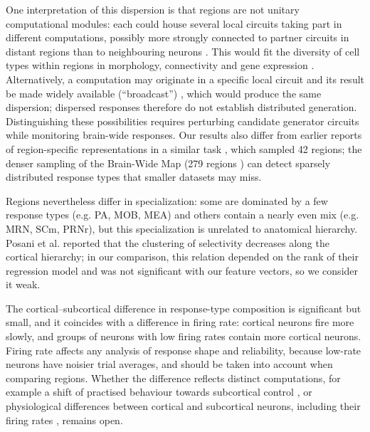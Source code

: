 \documentclass[10pt,lineno]{elife}
\begin{document}
One interpretation of this dispersion is that regions are not unitary computational modules: each could house several local circuits taking part in different computations, possibly more strongly connected to partner circuits in distant regions than to neighbouring neurons \cite{pessoa2022entangled, wagner2020neocortex, hayden2025rethinking}. This would fit the diversity of cell types within regions in morphology, connectivity and gene expression \cite{kaplan2025hypothalamic,gamlin2025sst,patino2024cortical,shainer2025tectum,gao2026projectomes,scala2021motor}. Alternatively, a computation may originate in a specific local circuit and its result be made widely available (``broadcast'') \cite{macdowell2025multiplexed}, which would produce the same dispersion; dispersed responses therefore do not establish distributed generation. Distinguishing these possibilities requires perturbing candidate generator circuits while monitoring brain-wide responses. Our results also differ from earlier reports of region-specific representations in a similar task \cite{steinmetz2019distributed}, which sampled 42 regions; the denser sampling of the Brain-Wide Map (279 regions \cite{international2025brain}) can detect sparsely distributed response types that smaller datasets may miss.

Regions nevertheless differ in specialization: some are dominated by a few response types (e.g. PA, MOB, MEA) and others contain a nearly even mix (e.g. MRN, SCm, PRNr), but this specialization is unrelated to anatomical hierarchy. Posani et al. \cite{posani2026rarely} reported that the clustering of selectivity decreases along the cortical hierarchy; in our comparison, this relation depended on the rank of their regression model and was not significant with our feature vectors, so we consider it weak.

The cortical--subcortical difference in response-type composition is significant but small, and it coincides with a difference in firing rate: cortical neurons fire more slowly, and groups of neurons with low firing rates contain more cortical neurons. Firing rate affects any analysis of response shape and reliability, because low-rate neurons have noisier trial averages, and should be taken into account when comparing regions. Whether the difference reflects distinct computations, for example a shift of practised behaviour towards subcortical control \cite{dhawale2019basal, yin2006role, murray2020remembrance}, or physiological differences between cortical and subcortical neurons, including their firing rates \cite{landemard2026brainwide}, remains open.
\end{document}
